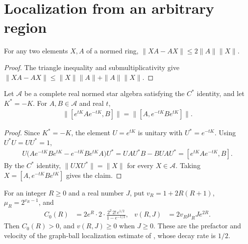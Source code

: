 \section{Localization from an arbitrary region}

\begin{lemma}
    \label{thm:qc_commutator_norm_bound}
    \leanok
    For any two elements $X,A$ of a normed ring,
    $\|XA-AX\|\leq2\|A\|\|X\|$.
\end{lemma}
\begin{proof}\leanok
    The triangle inequality and submultiplicativity give
    $\|XA-AX\|\leq\|X\|\|A\|+\|A\|\|X\|$.
\end{proof}

\begin{lemma}
    \label{thm:qc_commutator_reverse_evolution}
    \leanok
    Let $\mathcal A$ be a complete real normed star algebra satisfying the
    $C^*$ identity, and let $K^*=-K$. For $A,B\in\mathcal A$ and real $t$,
    \begin{align*}
        \|[e^{tK}Ae^{-tK},B]\|=\|[A,e^{-tK}Be^{tK}]\|.
    \end{align*}
\end{lemma}
\begin{proof}\leanok
    Since $K^*=-K$, the element $U=e^{tK}$ is unitary with $U^*=e^{-tK}$.
    Using $U^*U=UU^*=1$,
    \begin{align}
        U\bigl(Ae^{-tK}Be^{tK}-e^{-tK}Be^{tK}A\bigr)U^*
        =UAU^*B-BUAU^*=[e^{tK}Ae^{-tK},B].
    \end{align}
    By the $C^*$ identity, $\|UXU^*\|=\|X\|$ for every $X\in\mathcal A$.
    Taking $X=[A,e^{-tK}Be^{tK}]$ gives the claim.
\end{proof}

\begin{definition}
    \label{def:area_graph_ball_localization_constants}
    \leanok
    For an integer $R\geq0$ and a real number $J$, put $v_R=1+2R(R+1)$,
    $\mu_R=2^{v_R-1}$, and
    \begin{align*}
        C_0(R) & =2e^R\cdot2\cdot\frac{2^2\,2!\,e^{1/2}}{1-e^{-1/2}}, &
        v(R,J) & =2v_R\mu_RJe^{2R}.
    \end{align*}
    Then $C_0(R)>0$, and $v(R,J)\geq0$ when $J\geq0$. These are the prefactor
    and velocity of the graph-ball localization estimate of
    \cite[Lemma~4.1]{OpenAI2026AreaLaw}, whose decay rate is $1/2$.
\end{definition}

